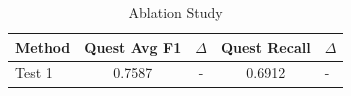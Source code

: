 
\begin{table}[h]
\centering
\caption{Ablation Study}
\label{tab:ablation}
\begin{tabular}{lccc}
\toprule
Method & Quest Avg F1 & $\Delta$ & Quest Recall & $\Delta$ \\
\midrule
Test 1 & 0.7587 & - & 0.6912 & - \\
\bottomrule
\end{tabular}
\end{table}
